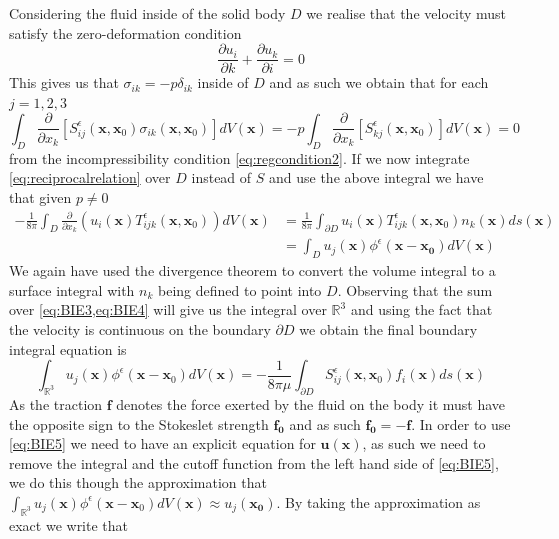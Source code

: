 Considering the fluid inside of the solid body $D$ we realise that the velocity must satisfy the zero-deformation condition
\begin{equation*}
  \frac{\partial u_i}{\partial k} + \frac{\partial u_k}{\partial i} = 0
\end{equation*}
This gives us that $\sigma_{ik} = -p\delta_{ik}$ inside of $D$ and as such we obtain that for each $j=1,2,3$
\begin{equation*}
  \int_{D} \frac{\partial}{\partial x_k}\left[S^\epsilon_{ij}\left(\mathbf{x}, \mathbf{x}_{0}\right)\sigma_{ik}\left(\mathbf{x}, \mathbf{x}_{0}\right)\right]dV(\mathbf{x}) = -p\int_{D} \frac{\partial}{\partial x_k}\left[S^\epsilon_{kj}\left(\mathbf{x}, \mathbf{x}_{0}\right)\right]dV(\mathbf{x}) = 0
\end{equation*}
from the incompressibility condition \cref{eq:regcondition2}. If we now integrate \cref{eq:reciprocalrelation} over $D$ instead of $S$ and use the above integral we have that given $p \neq 0$
\begin{equation}
\begin{aligned}
      \label{eq:BIE4}
-\frac{1}{8\pi}\int_{D} \frac{\partial}{\partial x_k}\left(u_i(\mathbf{x})T^\epsilon_{ijk}\left(\mathbf{x}, \mathbf{x}_{0}\right) \right) dV(\mathbf{x}) &= \frac{1}{8\pi}\int_{\partial D} u_i(\mathbf{x})T^\epsilon_{ijk}\left(\mathbf{x}, \mathbf{x}_{0}\right)n_k(\mathbf{x}) ds(\mathbf{x})\\
&= \int_D u_j(\mathbf{x}) \phi^\epsilon(\mathbf{x}-\mathbf{x_0}) dV(\mathbf{x})
\end{aligned}
\end{equation}
We again have used the divergence theorem to convert the volume integral to a surface integral with $n_k$ being defined to point into $D$. Observing that the sum over \cref{eq:BIE3,eq:BIE4} will give us the integral over $\mathbb{R}^{3}$ and using the fact that the velocity is continuous on the boundary $\partial D$ we obtain the final boundary integral equation is
\begin{equation}
  \label{eq:BIE5}
    \int_{\mathbb{R}^{3}} u_{j}(\mathbf{x}) \phi^{\epsilon}\left(\mathbf{x}-\mathbf{x}_{0}\right) d V(\mathbf{x})=-\frac{1}{8 \pi \mu} \int_{\partial D} S_{i j}^{\epsilon}\left(\mathbf{x}, \mathbf{x}_{0}\right) f_{i}(\mathbf{x}) d s(\mathbf{x})
\end{equation}
As the traction $\mathbf{f}$ denotes the force exerted by the fluid on the body it must have the opposite sign to the Stokeslet strength $\mathbf{f_0}$ and as such $\mathbf{f_0} = -\mathbf{f}$. In order to use \cref{eq:BIE5} we need to have an explicit equation for $\mathbf{u}(\mathbf{x})$, as such we need to remove the integral and the cutoff function from the left hand side of \cref{eq:BIE5}, we do this though the approximation that $\int_{\mathbb{R}^{3}} u_{j}(\mathbf{x}) \phi^{\epsilon}\left(\mathbf{x}-\mathbf{x}_{0}\right) d V(\mathbf{x}) \approx u_j(\mathbf{x_0})$. By taking the approximation as exact we write that 
